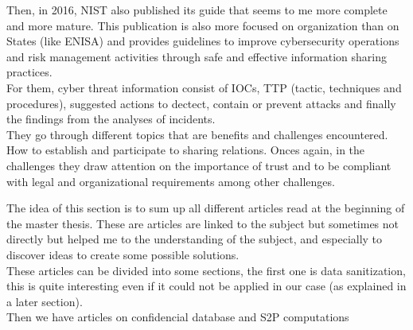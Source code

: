 \documentclass{eplmastersthesis}
\begin{document}
Then, in 2016, NIST also published its guide \cite{johnson2014guide} that seems to me more complete and more mature. This publication is also more focused on organization than on States (like ENISA) and provides guidelines to improve cybersecurity operations and risk management activities through safe and effective information sharing practices.\\
For them, cyber threat information consist of IOCs, TTP (tactic, techniques and procedures), suggested actions to dectect, contain or prevent attacks and finally the findings from the analyses of incidents. \\
They go through different topics that are benefits and challenges encountered. How to establish and participate to sharing relations. Onces again, in the challenges they draw attention on the importance of trust and to be compliant with legal and organizational requirements among other challenges.


The idea of this section is to sum up all different articles read at the beginning of the master thesis. These are articles are linked to the subject but sometimes not directly but helped me to the understanding of the subject, and especially to discover ideas to create some possible solutions.\\
These articles can be divided into some sections, the first one is data sanitization, this is quite interesting even if it could not be applied in our case (as explained in a later section).\\
Then we have articles on confidencial database and S2P computations 
\end{document}
